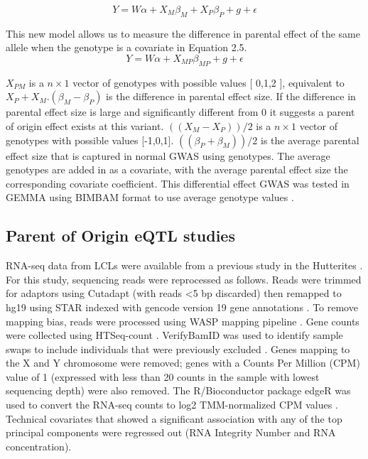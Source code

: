 \begin{equation}
Y =W\alpha + X_{M}\beta_{M}+ X_{P}\beta_{P}+g+\epsilon
\end{equation}

This new model allows us to measure the difference in parental effect of the same allele when the genotype is a covariate in Equation 2.5. 
\begin{equation}
Y =W\alpha + X_{MP}\beta_{MP}+g+\epsilon
\end{equation}

$X_{PM}$ is a $n \times 1$ vector of genotypes with possible values [ 0,1,2 ], equivalent to $X_P+ X_M. (\beta_M-\beta_P )$ is the difference in parental effect size. If the difference in parental effect size is large and significantly different from 0 it suggests a parent of origin effect exists at this variant. $((X_M-X_P ))/2$ is a $n \times 1$ vector of genotypes with possible values [-1,0,1].  $((\beta_P+\beta_M))/2$   is the average parental effect size that is captured in normal GWAS using genotypes. The average genotypes are added in as a covariate, with the average parental effect size the corresponding covariate coefficient. This differential effect GWAS was tested in GEMMA using BIMBAM format to use average genotype values \cite{Servin:2007gj}.


\subsection{Parent of Origin eQTL studies}\label{Parent of Origin eQTL studies}

RNA-seq data from LCLs were available from a previous study in the Hutterites \cite{Cusanovich:2016id}. For this study, sequencing reads were reprocessed as follows. Reads were trimmed for adaptors using Cutadapt (with reads \textless5 bp discarded) then remapped to hg19 using STAR indexed with gencode version 19 gene annotations \cite{Dobin:2002by,Martin:2011eu}. To remove mapping bias, reads were processed using WASP mapping pipeline \cite{vandeGeijn:2015hi}. Gene counts were collected using HTSeq-count \cite{Anders:2015gf}. VerifyBamID was used to identify sample swaps to include individuals that were previously excluded \cite{Jun:2012je}. Genes mapping to the X and Y chromosome were removed; genes with a Counts Per Million (CPM) value of 1 (expressed with less than 20 counts in the sample with lowest sequencing depth) were also removed. The R/Bioconductor package edgeR was used to convert the RNA-seq counts to log2 TMM-normalized CPM values \cite{Robinson:2010dd,Robinson:2010cw}. Technical covariates that showed a significant association with any of the top principal components were regressed out (RNA Integrity Number and RNA concentration).



